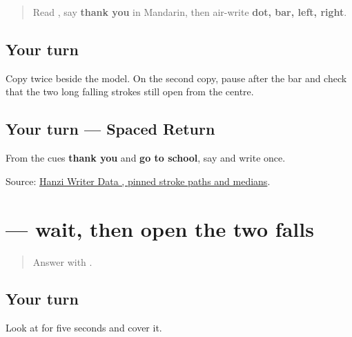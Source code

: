 \label{lesson:ZH-W17-wen-guided}



\begin{quote}
Read \textbf{}, say \textbf{thank you} in Mandarin, then air-write \textbf{dot, bar, left, right}.
\end{quote}

\subsection*{Your turn}

Copy \textbf{} twice beside the model. On the second copy, pause after the bar and check that the two long falling strokes still open from the centre.

\subsection*{Your turn — Spaced Return}
From the cues \textbf{thank you} and \textbf{go to school}, say  and write  once.

\begin{tcolorbox}[breakable,colback=teal!4,colframe=teal!35!black,title={Before you move on}]
Source: \href{https://raw.githubusercontent.com/chanind/hanzi-writer-data/68d10a4b21150cae5e1ebbd223eed289cf32d90c/data/\%E6\%96\%87.json}{Hanzi Writer Data , pinned stroke paths and medians}.
\end{tcolorbox}
\section[\texorpdfstring{\zh{文} (wén)}{文 (wén)}]{ — wait, then open the two falls}

\label{lesson:ZH-W17-wen-delayed}



\begin{quote}
Answer  with \textbf{}.
\end{quote}

\subsection*{Your turn}

Look at \textbf{} for five seconds and cover it.

